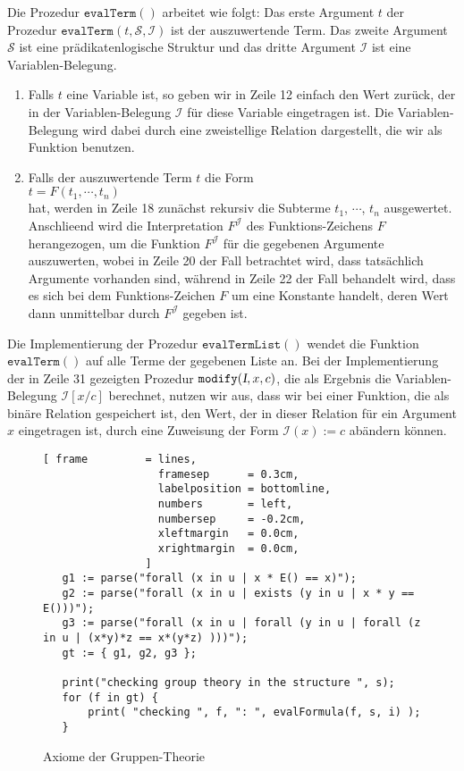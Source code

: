 Die Prozedur $\texttt{evalTerm}()$ arbeitet wie folgt:
Das erste Argument $t$  der Prozedur $\texttt{evalTerm}(t, \mathcal{S}, \mathcal{I})$  ist der
auszuwertende Term. Das zweite Argument $\mathcal{S}$ ist eine pr\"{a}dikatenlogische 
Struktur und das dritte Argument $\mathcal{I}$ ist eine Variablen-Belegung.
\begin{enumerate}
\item Falls $t$ eine Variable ist, so geben wir in Zeile 12 einfach den Wert zur\"{u}ck, der in
      der Variablen-Belegung 
      $\mathcal{I}$ f\"{u}r diese Variable eingetragen ist.  Die Variablen-Belegung wird dabei durch eine
      zweistellige Relation dargestellt, die wir als Funktion benutzen.
\item Falls der auszuwertende Term $t$ die Form 
      \\[0.2cm]
      \hspace*{1.3cm}
      $t = F(t_1,\cdots,t_n)$
      \\[0.2cm]
      hat,  werden in Zeile 18 zun\"{a}chst rekursiv die 
      Subterme $t_1$, $\cdots$, $t_n$ ausgewertet.  Anschlie\3end wird die Interpretation
      $F^\mathcal{J}$ des Funktions-Zeichens $F$ herangezogen, um die Funktion
      $F^\mathcal{J}$ f\"{u}r die gegebenen
      Argumente auszuwerten, wobei in Zeile 20 der Fall betrachtet wird, dass tats\"{a}chlich Argumente
      vorhanden sind, w\"{a}hrend  in Zeile 22 der Fall behandelt wird, dass es sich bei dem
      Funktions-Zeichen $F$ um eine Konstante handelt, deren Wert dann unmittelbar durch $F^\mathcal{J}$ gegeben ist.
\end{enumerate}
Die Implementierung der Prozedur $\texttt{evalTermList}()$ wendet die Funktion
$\mathtt{evalTerm}()$ auf alle Terme der gegebenen Liste an.
Bei der Implementierung der in Zeile 31 gezeigten Prozedur $\texttt{modify}(\textsl{I},x,c)$, 
die als Ergebnis die Variablen-Belegung $\mathcal{I}[x/c]$ berechnet, nutzen wir aus, dass
wir bei einer Funktion, die als bin\"{a}re Relation gespeichert ist, den Wert, der in dieser
Relation f\"{u}r ein Argument $x$ eingetragen ist, durch eine Zuweisung der Form
$\mathcal{I}(x) \mathtt{:=} c$ ab\"{a}ndern k\"{o}nnen.

\begin{figure}[!ht]
\centering
\begin{Verbatim}[ frame         = lines, 
                  framesep      = 0.3cm, 
                  labelposition = bottomline,
                  numbers       = left,
                  numbersep     = -0.2cm,
                  xleftmargin   = 0.0cm,
                  xrightmargin  = 0.0cm,
                ]
   g1 := parse("forall (x in u | x * E() == x)");
   g2 := parse("forall (x in u | exists (y in u | x * y == E()))");
   g3 := parse("forall (x in u | forall (y in u | forall (z in u | (x*y)*z == x*(y*z) )))");
   gt := { g1, g2, g3 };
   
   print("checking group theory in the structure ", s);
   for (f in gt) {
       print( "checking ", f, ": ", evalFormula(f, s, i) );
   }
\end{Verbatim}
\vspace*{-0.3cm}
\caption{Axiome der Gruppen-Theorie}
\label{fig:gruppen-theorie.stl}
\end{figure}

